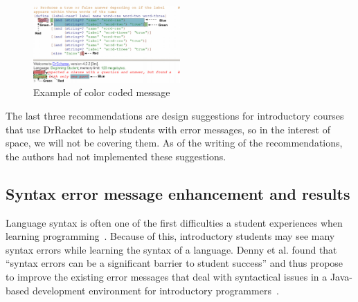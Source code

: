 \documentclass{sig-alternate}
\begin{document}
\begin{figure}
  \centering
  \includegraphics[keepaspectratio, width=0.50\textwidth]{ColorCodedMessage.pdf}
  \caption{Example of color coded message}
  \label{fig:colorcodedmessage}
\end{figure}

The last three recommendations are design suggestions for introductory courses that use DrRacket to help students with error messages, so in the interest of space, we will not be covering them.
As of the writing of the recommendations, the authors had not implemented these suggestions. 


\subsection{Syntax error message enhancement and results}\label{subsec:syntax enhancement}

Language syntax is often one of the first difficulties a student experiences when learning programming~\cite{Denny:2014:ESE:2591708.2591748}.
Because of this, introductory students may see many syntax errors while learning the syntax of a language.
Denny et al. found that ``syntax errors can be a significant barrier to student success'' and thus propose to improve the existing error messages that deal with syntactical issues in a Java-based development environment for introductory programmers~\cite{Denny:2014:ESE:2591708.2591748}.
\end{document}
